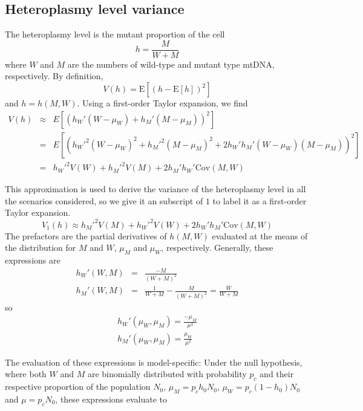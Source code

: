 \documentclass{article}
\begin{document}
\subsection*{Heteroplasmy level variance}\label{app:Taylor}
The heteroplasmy level is the mutant proportion of the cell
\begin{equation}
    h=\frac{M}{W+M}
\end{equation}
where $W$ and $M$ are the numbers of wild-type and mutant type mtDNA, respectively. By definition,
\begin{equation}
    V(h)=\mathrm{E}\left[(h-\mathrm{E}[h])^2\right]
\end{equation}
and $h=h(M,W)$. Using a first-order Taylor expansion, we find
\begin{eqnarray}
    V(h) & \approx &  E[(h_W'(W-\mu_W)+h_M'(M-\mu_M))^2]\\
 & = & E[(h_W'^2(W-\mu_W)^2+h_M'^2(M-\mu_M)^2  + 2h_W'h_M'(W-\mu_W)(M-\mu_M))^2]\\
 & = & h_W'^2V(W)+h_M'^2V(M)+2h_M'h_W'\mathrm{Cov}(M,W)
\end{eqnarray}

This approximation is used to derive the variance of the heteroplasmy level in all the scenarios considered, so we give it an subscript of $1$ to label it as a first-order Taylor expansion.
\begin{equation}\label{eq:AppV1hGen}
    V_1(h)\approx h_M'^2V(M) + h_W'^2V(W)+2h_W'h_M'\mathrm{Cov}(M,W)
\end{equation}
The prefactors are the partial derivatives of $h(M,W)$ evaluated at the means of the distribution for $M$ and $W$, $\mu_M$ and $\mu_W$, respectively. Generally, these expressions are 
\begin{eqnarray}
h_W'(W,M)& = &\frac{-M}{(W+M)^2}\\
h_M'(W,M)& = & \frac{1}{W+M}-\frac{M}{(W+M)^2}=\frac{W}{W+M}
\end{eqnarray}
so
\begin{eqnarray}
h_W'(\mu_W,\mu_M)=\frac{-\mu_M}{\mu^2} \\
h_M'(\mu_W,\mu_M)=\frac{\mu_W}{\mu^2}
\end{eqnarray}

The evaluation of these expressions is model-specific: Under the null hypothesis, where both $W$ and $M$ are binomially distributed with probability $p_c$ and their respective proportion of the population $N_0$, $\mu_M=p_ch_0N_0$, $\mu_W=p_c(1-h_0)N_0$ and $\mu = p_cN_0$, these expressions evaluate to
\end{document}

